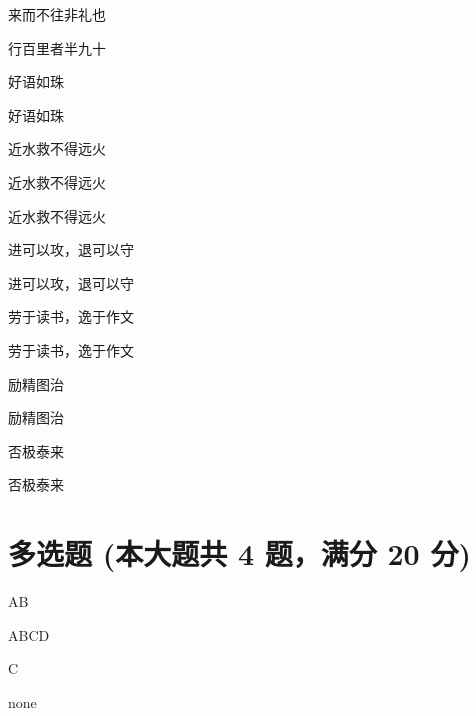 \documentclass[12pt, a4paper, addpoints]{exam}
\begin{document}
\begin{multicols}{2}
\begin{questions}
\question[2] 来而不往非礼也

\question[2] 行百里者半九十

\question[2] 好语如珠

\question[2] 好语如珠

\question[2] 近水救不得远火

\question[2] 近水救不得远火

\question[2] 近水救不得远火

\question[2] 进可以攻，退可以守

\question[2] 进可以攻，退可以守

\question[2] 劳于读书，逸于作文

\question[2] 劳于读书，逸于作文

\question[2] 励精图治

\question[2] 励精图治

\question[2] 否极泰来

\question[2] 否极泰来

\end{questions}
\end{multicols}

\hspace{5cm}

\section{\normalsize{多选题 (本大题共 4 题，满分 20 分)}}
\hspace{1.5cm}

\begin{questions}
\question[5] AB

\begin{oneparcheckboxes}
\end{oneparcheckboxes}

\question[5] ABCD

\begin{oneparcheckboxes}
\end{oneparcheckboxes}

\question[5] C

\begin{oneparcheckboxes}
\end{oneparcheckboxes}

\question[5] none

\begin{oneparcheckboxes}
\end{oneparcheckboxes}

\end{questions}
\end{document}
